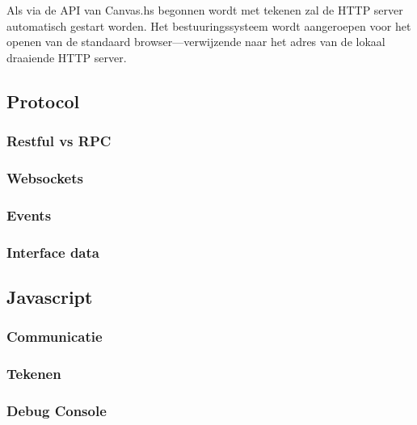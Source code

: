 \documentclass[a4paper]{report}
\begin{document}
Als via de API van Canvas.hs begonnen wordt met tekenen zal de HTTP server automatisch gestart worden. Het bestuuringssysteem wordt aangeroepen voor het openen van de standaard browser—verwijzende naar het adres van de lokaal draaiende HTTP server.
\subsection{Protocol}
\subsubsection{Restful vs RPC}
\subsubsection{Websockets}
\subsubsection{Events}
\subsubsection{Interface data}
\subsection{Javascript}
\subsubsection{Communicatie}
\subsubsection{Tekenen}
\subsubsection{Debug Console}

\newpage


\end{document}
